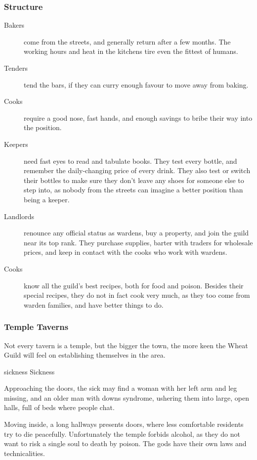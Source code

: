 \begin{multicols}{2}
\subsubsection{Structure}

\begin{description}
  \item[Bakers]
  come from the streets, and generally return after a few months.
  The working hours and heat in the kitchens tire even the fittest of humans.
  \item[Tenders]
  tend the bars, if they can curry enough favour to move away from baking.
  \item[Cooks]
  require a good nose, fast hands, and enough savings to bribe their way into the position.
  \item[Keepers]
  need fast eyes to read and tabulate books.
  They test every bottle, and remember the daily-changing price of every drink.
  They also test or switch their bottles to make sure they don't leave any shoes for someone else to step into, as nobody from the streets can imagine a better position than being a keeper.
  \item[Landlords]
  renounce any official status as wardens, buy a property, and join the guild near its top rank.
  They purchase supplies, barter with traders for wholesale prices, and keep in contact with the cooks who work with wardens.
  \item[Cooks]
  know all the guild's best recipes, both for food and poison.
  Besides their special recipes, they do not in fact cook very much, as they too come from warden families, and have better things to do.
\end{description}

\subsubsection{Temple Taverns}

Not every tavern is a temple, but the bigger the town, the more keen the Wheat Guild will feel on establishing themselves in the area.

  {\gls{sickness}}%
  {Sickness}%
  {
    Approaching the doors, the sick may find a woman with her left arm and leg missing, and an older man with downs syndrome, ushering them into large, open halls, full of beds where people chat.

    Moving inside, a long hallways presents doors, where less comfortable residents try to die peacefully.
    Unfortunately the temple forbids alcohol, as they do not want to risk a single soul to death by poison.
    The gods have their own laws and technicalities.

}
\end{multicols}
